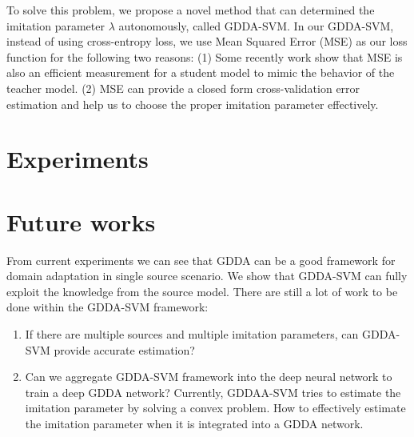 \documentclass[11pt,onecolumn]{article}
\begin{document}
To solve this problem, we propose a novel method that can determined the imitation parameter $\lambda$ autonomously, called GDDA-SVM. In our GDDA-SVM, instead of using cross-entropy loss, we use Mean Squared Error (MSE) as our loss function for the following two reasons: (1) Some recently work \cite{ba2014deep} \cite{luo2016face} \cite{romero2014fitnets} \cite{urban2016deep} show that MSE is also an efficient measurement for a student model to mimic the behavior of the teacher model. (2) MSE can provide a closed form cross-validation error estimation and help us to choose the proper imitation parameter effectively. 



%


\section{Experiments}


\section{Future works}
From current experiments we can see that GDDA can be a good framework for domain adaptation in single source scenario. We show that GDDA-SVM can fully exploit the knowledge from the source model. There are still a lot of work to be done within the GDDA-SVM framework:
\begin{enumerate}
\item If there are multiple sources and multiple imitation parameters, can GDDA-SVM provide accurate estimation?
\item Can we aggregate GDDA-SVM framework into the deep neural network to train a deep GDDA network? Currently, GDDAA-SVM tries to estimate the imitation parameter by solving a convex problem. How to effectively estimate the imitation parameter when it is integrated into a GDDA network. 
\end{enumerate}


\end{document}
